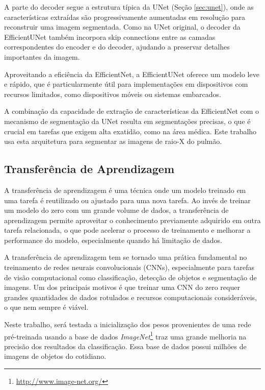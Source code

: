 \documentclass[a4,12pt]{horizon-theme}
\begin{document}
A parte do decoder segue a estrutura típica da UNet (Seção \ref{sec:unet}), onde as características extraídas são progressivamente aumentadas em resolução para reconstruir uma imagem segmentada. Como na UNet original, o decoder da EfficientUNet também incorpora skip connections entre as camadas correspondentes do encoder e do decoder, ajudando a preservar detalhes importantes da imagem.

Aproveitando a eficiência da EfficientNet, a EfficientUNet oferece um modelo leve e rápido, que é particularmente útil para implementações em dispositivos com recursos limitados, como dispositivos móveis ou sistemas embarcados.

A combinação da capacidade de extração de características da EfficientNet com o mecanismo de segmentação da UNet resulta em segmentações precisas, o que é crucial em tarefas que exigem alta exatidão, como na área médica. Este trabalho usa esta arquitetura para segmentar as imagens de raio-X do pulmão.



\subsection{Transferência de Aprendizagem}
\label{sec:tl}
A transferência de aprendizagem \citep{transfer} é uma técnica onde um modelo treinado em uma tarefa é reutilizado ou ajustado para uma nova tarefa. Ao invés de treinar um modelo do zero com um grande volume de dados, a transferência de aprendizagem permite aproveitar o conhecimento previamente adquirido em outra tarefa relacionada, o que pode acelerar o processo de treinamento e melhorar a performance do modelo, especialmente quando há limitação de dados.

A transferência de aprendizagem tem se tornado uma prática fundamental no treinamento de redes neurais convolucionais (CNNs), especialmente para tarefas de visão computacional como classificação, detecção de objetos e segmentação de imagens. Um dos principais motivos é que treinar uma CNN do zero requer grandes quantidades de dados rotulados e recursos computacionais consideráveis, o que nem sempre é viável.

Neste trabalho, será testada a inicialização dos pesos provenientes de uma rede pré-treinada usando a base de dados \emph{ImageNet}\footnote{\url{http://www.image-net.org/}} traz uma grande melhoria na precisão dos resultados da classificação. Essa base de dados possui milhões de imagens de objetos do cotidiano.
\end{document}
